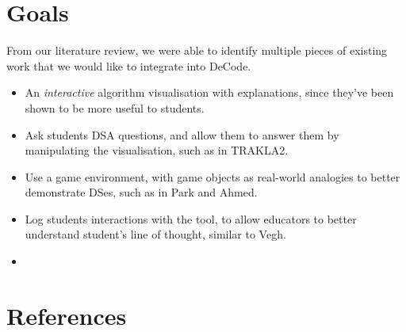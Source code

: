 \documentclass[10pt]{article}
\begin{document}
\section{Goals}
From our literature review, we were able to identify multiple pieces of existing work that we would like to integrate into DeCode.
\begin{itemize}
  \item An \emph{interactive} algorithm visualisation with explanations, since they've been shown to be more useful to students\cite{vegh2}.
  \item Ask students DSA questions, and allow them to answer them by manipulating the visualisation, such as in TRAKLA2\cite{TRAKLA2}.
  \item Use a game environment, with game objects as real-world analogies to better demonstrate DSes, such as in Park and Ahmed\cite{Park}.
  \item Log students interactions with the tool, to allow educators to better understand student's line of thought, similar to Vegh\cite{vegh}.
  \item 
\end{itemize}

\begingroup

\section*{References}
  \vspace{2mm}

  \renewcommand{\section}[2]{}

  \begin{spacing}{1.0}

    
    \small
    

  \end{spacing}

\endgroup
\end{document}
